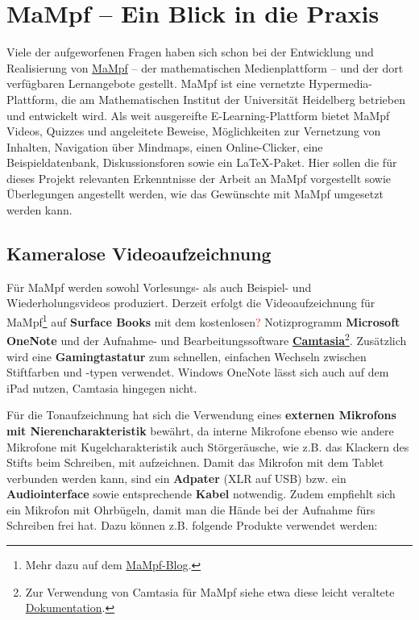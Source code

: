 \documentclass[parskip=off,index=totocnumbered]{scrreprt}
\begin{document}
\chapter{MaMpf -- Ein Blick in die Praxis}
Viele der aufgeworfenen Fragen haben sich schon bei der Entwicklung und Realisierung von \href{https://mampf.mathi.uni-heidelberg.de/}{MaMpf} -- der mathematischen Medienplattform -- und der dort verfügbaren Lernangebote gestellt. MaMpf ist eine vernetzte Hypermedia-Plattform, die am Mathematischen Institut der Universität Heidelberg betrieben und entwickelt wird. Als weit ausgereifte E-Learning-Plattform bietet MaMpf Videos, Quizzes und angeleitete Beweise, Möglichkeiten zur Vernetzung von Inhalten, Navigation über Mindmaps, einen Online-Clicker, eine Beispieldatenbank, Diskussionsforen sowie ein \LaTeX-Paket. Hier sollen die für dieses Projekt relevanten Erkenntnisse der Arbeit an MaMpf vorgestellt sowie Überlegungen angestellt werden, wie das Gewünschte mit MaMpf umgesetzt werden kann.

\section{Kameralose Videoaufzeichnung}
Für MaMpf werden sowohl Vorlesungs- als auch Beispiel- und Wiederholungsvideos produziert. Derzeit erfolgt die Videoaufzeichnung für MaMpf\footnote{Mehr dazu auf dem \href{https://mampf.blog/kameralose-videoaufzeichnung/}{MaMpf-Blog}.} auf \textbf{Surface Books} mit dem kostenlosen\textcolor{red}{?} Notizprogramm \textbf{Microsoft OneNote} und der Aufnahme- und Bearbeitungssoftware \textbf{\href{https://www.techsmith.de/camtasia.html}{Camtasia}}\footnote{Zur Verwendung von Camtasia für MaMpf siehe etwa diese leicht veraltete \href{https://github.com/hungrywords/MaMpf_Doc}{Dokumentation}.}. Zusätzlich wird eine \textbf{Gamingtastatur} zum schnellen, einfachen Wechseln zwischen Stiftfarben und -typen verwendet. Windows OneNote lässt sich auch auf dem iPad nutzen, Camtasia hingegen nicht.

Für die Tonaufzeichnung hat sich die Verwendung eines \textbf{externen Mikrofons mit Nierencharakteristik} bewährt, da interne Mikrofone ebenso wie andere Mikrofone mit Kugelcharakteristik auch Störgeräusche, wie z.B. das Klackern des Stifts beim Schreiben, mit aufzeichnen. Damit das Mikrofon mit dem Tablet verbunden werden kann, sind ein \textbf{Adpater} (XLR auf USB) bzw. ein \textbf{Audiointerface} sowie entsprechende \textbf{Kabel} notwendig. Zudem empfiehlt sich ein Mikrofon mit Ohrbügeln, damit man die Hände bei der Aufnahme fürs Schreiben frei hat. Dazu können z.B. folgende Produkte verwendet werden:  
\end{document}

